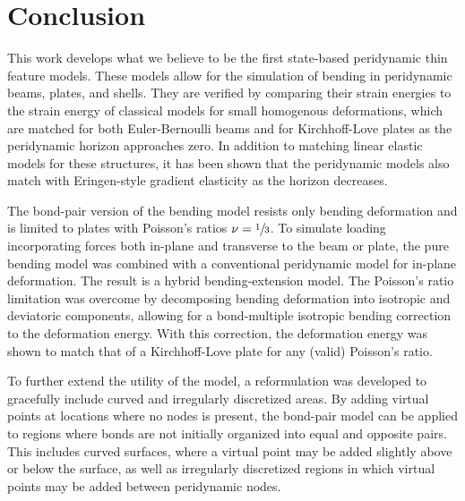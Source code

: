\chapter{Conclusion}

This work develops what we believe to be the first state-based peridynamic thin feature models.
These models allow for the simulation of bending in peridynamic beams, plates, and shells.
They are verified by comparing their strain energies to the strain energy of classical models for small homogenous deformations, which are matched for both Euler-Bernoulli beams and for Kirchhoff-Love plates as the peridynamic horizon approaches zero.
In addition to matching linear elastic models for these structures, it has been shown that the peridynamic models also match with Eringen-style gradient elasticity as the horizon decreases.

The bond-pair version of the bending model resists only bending deformation and is limited to plates with Poisson's ratios $\nu = \sfrac{1}{3}$.
To simulate loading incorporating forces both in-plane and transverse to the beam or plate, the pure bending model was combined with a conventional peridynamic model for in-plane deformation.
The result is a hybrid bending-extension model.
The Poisson's ratio limitation was overcome by decomposing bending deformation into isotropic and deviatoric components, allowing for a bond-multiple isotropic bending correction to the deformation energy.
With this correction, the deformation energy was shown to match that of a Kirchhoff-Love plate for any (valid) Poisson's ratio.

To further extend the utility of the model, a reformulation was developed to gracefully include curved and irregularly discretized areas.
By adding virtual points at locations where no nodes is present, the bond-pair model can be applied to regions where bonds are not initially organized into equal and opposite pairs.
This includes curved surfaces, where a virtual point may be added slightly above or below the surface, as well as irregularly discretized regions in which virtual points may be added between peridynamic nodes.

